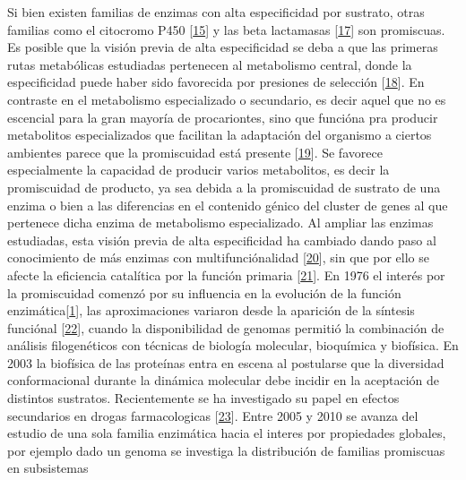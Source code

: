 \documentclass[12pt,twoside]{reedthesis}
\begin{document}
  Si bien existen familias de enzimas con alta especificidad por sustrato,
  otras familias como el citocromo P450
  {[}\protect\hyperlink{ref-bloom_neutral_2007}{15}{]} y las beta
  lactamasas {[}\protect\hyperlink{ref-zou_evolution_2015}{17}{]} son
  promiscuas. Es posible que la visión previa de alta especificidad se
  deba a que las primeras rutas metabólicas estudiadas pertenecen al
  metabolismo central, donde la especificidad puede haber sido favorecida
  por presiones de selección
  {[}\protect\hyperlink{ref-firn_darwinian_2009}{18}{]}. En contraste en
  el metabolismo especializado o secundario, es decir aquel que no es
  escencial para la gran mayoría de procariontes, sino que funcióna pra
  producir metabolitos especializados que facilitan la adaptación del
  organismo a ciertos ambientes parece que la promiscuidad está presente
  {[}\protect\hyperlink{ref-weng_promiscuity_specialized_pathways_2012}{19}{]}.
  Se favorece especialmente la capacidad de producir varios metabolitos,
  es decir la promiscuidad de producto, ya sea debida a la promiscuidad de
  sustrato de una enzima o bien a las diferencias en el contenido génico
  del cluster de genes al que pertenece dicha enzima de metabolismo
  especializado. Al ampliar las enzimas estudiadas, esta visión previa de
  alta especificidad ha cambiado dando paso al conocimiento de más enzimas
  con multifunciónalidad
  {[}\protect\hyperlink{ref-jia_multifunctional_2013}{20}{]}, sin que por
  ello se afecte la eficiencia catalítica por la función primaria
  {[}\protect\hyperlink{ref-aharoni_evolvability_2005}{21}{]}. En 1976 el
  interés por la promiscuidad comenzó por su influencia en la evolución de
  la función
  enzimática{[}\protect\hyperlink{ref-jensen_enzyme_1976}{1}{]}, las
  aproximaciones variaron desde la aparición de la síntesis funciónal
  {[}\protect\hyperlink{ref-dean_mechanistic_2007}{22}{]}, cuando la
  disponibilidad de genomas permitió la combinación de análisis
  filogenéticos con técnicas de biología molecular, bioquímica y
  biofísica. En 2003 la biofísica de las proteínas entra en escena al
  postularse que la diversidad conformacional durante la dinámica
  molecular debe incidir en la aceptación de distintos sustratos.
  Recientemente se ha investigado su papel en efectos secundarios en
  drogas farmacologicas
  {[}\protect\hyperlink{ref-nobeli_protein_2009}{23}{]}. Entre 2005 y 2010
  se avanza del estudio de una sola familia enzimática hacia el interes
  por propiedades globales, por ejemplo dado un genoma se investiga la
  distribución de familias promiscuas en subsistemas
\end{document}
